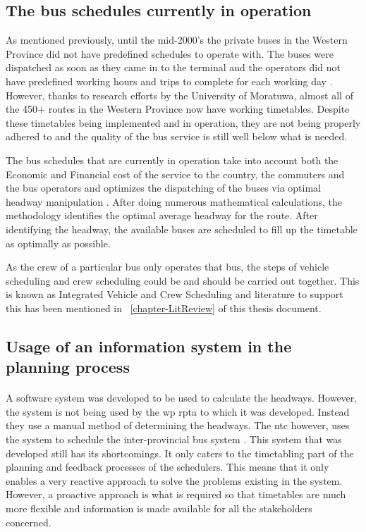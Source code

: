 \subsection{The bus schedules currently in operation}

As mentioned previously, until the mid-2000's the private buses in the Western Province did not have predefined schedules to operate with. The buses were dispatched as soon as they came in to the terminal and the operators did not have predefined working hours and trips to complete for each working day \cite{Piyadasa2005}. However, thanks to research efforts by the University of Moratuwa, almost all of the 450+ routes in the Western Province now have working timetables. Despite these timetables being implemented and in operation, they are not being properly adhered to and the quality of the bus service is still well below what is needed.

The bus schedules that are currently in operation take into account both the Economic and Financial cost of the service to the country, the commuters and the bus operators and optimizes the dispatching of the buses via optimal headway manipulation \cite{Piyadasa2005}. After doing numerous mathematical calculations, the methodology identifies the optimal average headway for the route. After identifying the headway, the available buses are scheduled to fill up the timetable as optimally as possible.

As the crew of a particular bus only operates that bus, the steps of vehicle scheduling and crew scheduling could be and should be carried out together. This is known as Integrated Vehicle and Crew Scheduling and literature to support this has been mentioned in ~\ref{chapter-LitReview} of this thesis document.

\subsection{Usage of an information system in the planning process}

\paragraph{ } A software system was developed to be used to calculate the headways. However, the system is not being used by the \acrshort{wp} \acrshort{rpta} to which it was developed. Instead they use a manual method of determining the headways. The \acrshort{ntc} however, uses the system to schedule the inter-provincial bus system \cite{Piyadasa2013}. This system that was developed still has its shortcomings. It only caters to the timetabling part of the planning and feedback processes of the schedulers. This means that it only enables a very reactive approach to solve the problems existing in the system. However, a proactive approach is what is required so that timetables are much more flexible and information is made available for all the stakeholders concerned.

